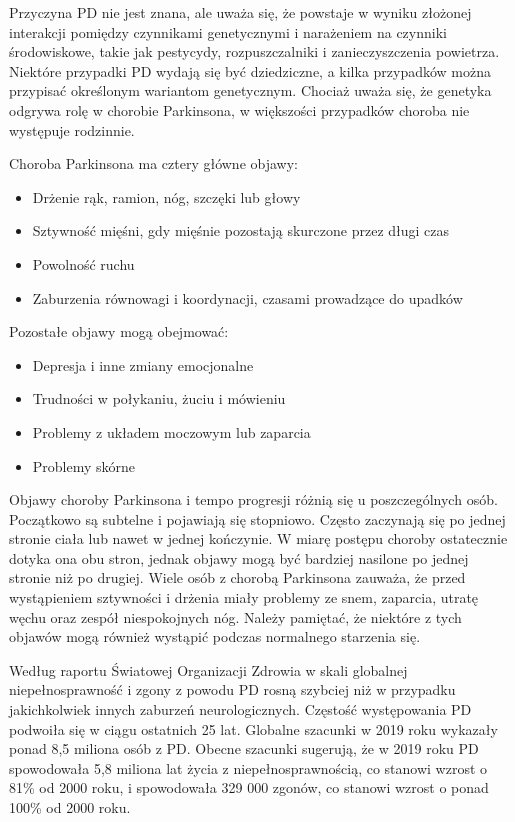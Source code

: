 Przyczyna PD nie jest znana, ale uważa się, że powstaje w wyniku złożonej interakcji pomiędzy czynnikami genetycznymi i
narażeniem na czynniki środowiskowe, takie jak pestycydy, rozpuszczalniki i zanieczyszczenia powietrza.
Niektóre przypadki PD wydają się być dziedziczne, a kilka przypadków można przypisać określonym wariantom genetycznym.
Chociaż uważa się, że genetyka odgrywa rolę w chorobie Parkinsona, w większości przypadków choroba nie występuje rodzinnie\cite{National_Institute_on_Aging_2022}.

Choroba Parkinsona ma cztery główne objawy:
\begin{itemize}
\item Drżenie rąk, ramion, nóg, szczęki lub głowy
\item Sztywność mięśni, gdy mięśnie pozostają skurczone przez długi czas
\item Powolność ruchu
\item Zaburzenia równowagi i koordynacji, czasami prowadzące do upadków
\end{itemize}


Pozostałe objawy mogą obejmować:
\begin{itemize}
\item Depresja i inne zmiany emocjonalne
\item Trudności w połykaniu, żuciu i mówieniu
\item Problemy z układem moczowym lub zaparcia
\item Problemy skórne
\end{itemize}

Objawy choroby Parkinsona i tempo progresji różnią się u poszczególnych osób.
Początkowo są subtelne i pojawiają się stopniowo.
Często zaczynają się po jednej stronie ciała lub nawet w jednej kończynie.
W miarę postępu choroby ostatecznie dotyka ona obu stron, jednak objawy mogą być bardziej nasilone po jednej stronie niż po drugiej.
Wiele osób z chorobą Parkinsona zauważa, że przed wystąpieniem sztywności i drżenia miały problemy ze snem, zaparcia, utratę węchu oraz zespół niespokojnych nóg.
Należy pamiętać, że niektóre z tych objawów mogą również wystąpić podczas normalnego starzenia się\cite{National_Institute_on_Aging_2022}.


Według raportu Światowej Organizacji Zdrowia\cite{WHO} w skali globalnej niepełnosprawność i zgony z powodu PD
rosną szybciej niż w przypadku jakichkolwiek innych zaburzeń neurologicznych.
Częstość występowania PD podwoiła się w ciągu ostatnich 25 lat.
Globalne szacunki w 2019 roku wykazały ponad 8,5 miliona osób z PD.
Obecne szacunki sugerują, że w 2019 roku PD spowodowała 5,8 miliona lat życia z niepełnosprawnością, co
stanowi wzrost o 81\% od 2000 roku, i spowodowała 329 000 zgonów, co stanowi wzrost o ponad 100\% od 2000 roku.



